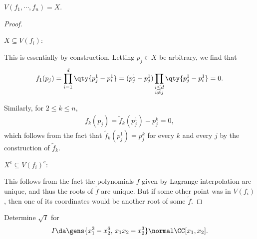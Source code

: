 \begin{solution}
\begin{proposition}
\(V(f_1, \cdots, f_n) = X\).

\end{proposition}

\begin{proof}

\begin{claim}

\(X\subseteq V(f_i)\):

\end{claim}

This is essentially by construction. Letting \(p_j\in X\) be arbitrary,
we find that
\begin{align*}  
f_1(p_j) 
= \prod_{i=1}^d \qty{p_j^1 - p_i^1}
= (p_j^1 - p_j^1) \prod_{\substack{i\leq d \\ i\neq j}} \qty{p_j^1 - p_i^1} = 0
.\end{align*}

Similarly, for \(2\leq k \leq n\),
\begin{align*}  
f_k(p_j) = \tilde f_k(p_j^1) - p_j^k = 0 
,\end{align*} which follows from the fact that
\(\tilde f_k(p_j^1) = p_j^k\) for every \(k\) and every \(j\) by the
construction of \(\tilde f_k\).

\begin{claim}

\(X^c \subseteq V(f_i)^c\):

\end{claim}

This follows from the fact the polynomials \(f\) given by Lagrange
interpolation are unique, and thus the roots of \(\tilde f\) are unique.
But if some other point was in \(V(f_i)\), then one of its coordinates
would be another root of some \(\tilde f\).

\end{proof}

\end{solution}

\begin{exercise}[Gathmann 1.21]

Determine \(\sqrt{I}\) for
\begin{align*}  
I\da \gens{x_1^3 - x_2^6,\, x_1 x_2 - x_2^3} \normal \CC[x_1, x_2]
.\end{align*}

\end{exercise}

